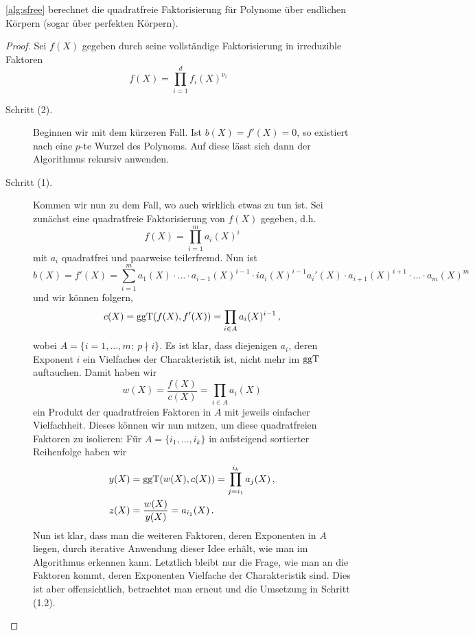\begin{thm}
  \autoref{alg:sfree} berechnet die quadratfreie Faktorisierung für Polynome
  über endlichen Körpern (sogar über perfekten Körpern).
\end{thm}
\begin{proof}
  Sei $f(X)$ gegeben durch seine vollständige Faktorisierung in irreduzible
  Faktoren 
  \[ f(X) = \prod_{i=1}^d f_i(X)^{\nu_i}\]
  \begin{description}
    \item[Schritt (2).] Beginnen wir mit dem kürzeren Fall.
      Ist $b(X) = f'(X) = 0$, so existiert nach  eine
      $p$-te Wurzel des Polynoms. Auf diese lässt sich dann der Algorithmus
      rekursiv anwenden.
    \item[Schritt (1).] Kommen wir nun zu dem Fall, wo auch wirklich etwas zu tun
      ist. Sei zunächst eine quadratfreie Faktorisierung von $f(X)$ gegeben,
      d.h.
      \[ f(X) = \prod_{i=1}^m a_i(X)^i \]
      mit $a_i$ quadratfrei und paarweise teilerfremd.
      Nun ist
      \[ b(X) = f'(X) = \sum_{i=1}^m a_1(X) \cdot \ldots\cdot a_{i-1}(X)^{i-1}
        \cdot i a_i(X)^{i-1} a_i'(X)\cdot a_{i+1}(X)^{i+1}\cdot\ldots\cdot
        a_m(X)^m\]
      und wir können folgern, 
      \[ c(X) = \operatorname{ggT}(f(X),f'(X)) = \prod_{i\in A} a_i(X)^{i-1}\,,\]
      wobei $A = \{i=1,\ldots,m:\ p\nmid i\}$. Es ist klar, dass diejenigen
      $a_i$, deren Exponent $i$ ein Vielfaches der Charakteristik ist,
      nicht mehr im $\operatorname{ggT}$ auftauchen. Damit haben wir
      \[ w(X) = \frac{f(X)}{c(X)} = \prod_{i\in A} a_i(X) \]
      ein Produkt der quadratfreien Faktoren in $A$ mit jeweils einfacher
      Vielfachheit. Dieses können wir nun nutzen, um diese quadratfreien Faktoren
      zu isolieren: Für $A = \{i_1,\ldots,i_k\}$ in aufsteigend sortierter
      Reihenfolge haben wir
      \begin{align*}
        y(X) &= \operatorname{ggT}(w(X),c(X)) = \prod_{j=i_1}^{i_k} a_j(X)\,,\\
        z(X) &= \frac{w(X)}{y(X)} = a_{i_1}(X)\,.
      \end{align*}
      Nun ist klar, dass man die weiteren Faktoren, deren Exponenten in $A$
      liegen, durch iterative Anwendung dieser Idee erhält, wie man im 
      Algorithmus erkennen kann. Letztlich bleibt nur die Frage, wie man an die
      Faktoren kommt, deren Exponenten Vielfache der Charakteristik sind.
      Dies ist aber offensichtlich, betrachtet man erneut
       und die Umsetzung in Schritt (1.2). 
  \end{description}
\end{proof}
